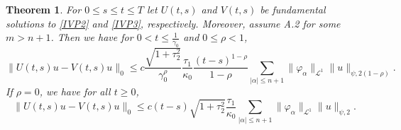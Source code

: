 \documentclass[a4paper, 12pt]{report}
\newtheorem{theorem}{Theorem}[section]
\theoremstyle{cor}
\theoremstyle{remark}
\theoremstyle{definition}
\begin{document}
\begin{theorem}
For $0 \le s \le t \le T$ let $U(t, s)$ and $V(t, s)$ be fundamental solutions to \eqref{IVP2} and \eqref{IVP3}, respectively.  Moreover, assume A.2 for some $m > n + 1$.  Then we have for $0 < t \le \frac{1}{\gamma_0}$ and $0 \le \rho < 1$,
\begin{equation}
\|U(t, s)u - V(t, s)u\|_0 \le c\frac{\sqrt{1 + \tau_2^2}}{\gamma_0^\rho}\frac{\tau_1}{\kappa_0}\frac{(t - s)^{1 - \rho}}{1 - \rho}\sum_{|\alpha| \le n + 1}\|\varphi_\alpha\|_{\mathcal{L}^1}\|u\|_{\psi, 2(1 - \rho)}.
\end{equation}
If $\rho = 0$, we have for all $t \ge 0$,
\begin{equation}
\|U(t, s)u - V(t, s)u\|_0 \le c(t - s)\sqrt{1 + \tau_2^2}\frac{\tau_1}{\kappa_0}\sum_{|\alpha| \le n + 1}\|\varphi_\alpha\|_{\mathcal{L}^1}\|u\|_{\psi, 2}.
\end{equation}
\end{theorem}
\end{document}

